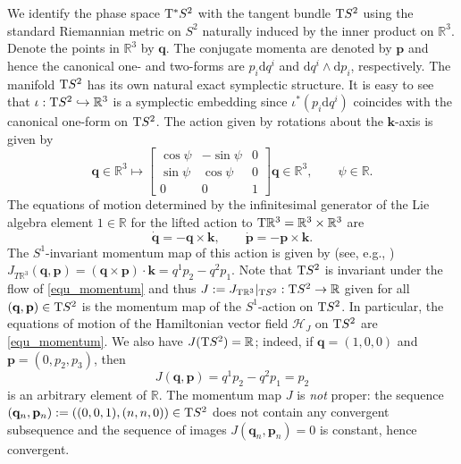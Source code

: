 \documentclass[11pt]{article}
\newcommand{\DD}{\mathrm{d}}
\begin{document}
We identify the phase space ${\rm T}^\ast S^2$ with the tangent bundle
${\rm T}S^2$ using the standard Riemannian metric on $S^2$ naturally
induced by the inner product on $\mathbb{R}^3$. Denote the points in
$\mathbb{R}^3$ by $\mathbf{q}$. The conjugate momenta are denoted by
$\mathbf{p}$ and hence the canonical one- and two-forms are $p_i\DD
q^i$ and $\DD q^i\wedge \DD p _i$, respectively.  The manifold ${\rm
  T}S ^2$ has its own natural exact symplectic structure.  It is easy
to see that $\iota:{\rm T} S ^2 \hookrightarrow \mathbb{R}^3$ is a
symplectic embedding since $\iota^\ast\left(p_i\DD q^i\right)$
coincides with the canonical one-form on ${\rm T}S^2$. The action
given by rotations about the $\mathbf{k}$-axis is given by
\begin{equation}
  \label{action_formula}
  \mathbf{q}\in \mathbb{R}^3 \mapsto
  \begin{bmatrix}
    \cos \psi &-\sin \psi&0\\
    \sin \psi & \cos \psi& 0\\
    0&0& 1
  \end{bmatrix} \mathbf{q} \in \mathbb{R}^3, \qquad \psi \in
  \mathbb{R}. \nonumber
\end{equation}
The equations of motion determined by the infinitesimal generator of
the Lie algebra element $1 \in \mathbb{R}$ for the lifted action to
${\rm T} \mathbb{R}^3 = \mathbb{R}^3\times \mathbb{R}^3$ are
\begin{equation}
  \label{equ_momentum}
  \dot{\mathbf{q}} = - \mathbf{q} \times \mathbf{k}, \qquad 
  \dot{\mathbf{p}} = - \mathbf{p}\times \mathbf{k}.
\end{equation}
The $S^1$-invariant momentum map of this action is given by (see,
e.g., \cite[Theorem 12.1.4]{MaRa2003}) $J_{T \mathbb{R}^3}(\mathbf{q},
\mathbf{p}) = (\mathbf{q}\times \mathbf{p}) \cdot \mathbf{k} = q^1p_2
- q^2p_1$. Note that ${\rm T}S^2$ is invariant under the flow of
\eqref{equ_momentum} and thus $J:=J_{{\rm T} \mathbb{R}^3}|_{{\rm
    T}S^2}:{\rm T}S^2 \rightarrow \mathbb{R}$ given for all
$(\mathbf{q}, \mathbf{p}) \in {\rm T}S^2$ is the momentum map of the
$S^1$-action on ${\rm T}S^2$. In particular, the equations of motion
of the Hamiltonian vector field $\mathcal{H}_J $ on ${\rm T}S^2$ are
\eqref{equ_momentum}.  We also have $J({\rm T}S^2) = \mathbb{R}$;
indeed, if $\mathbf{q}=(1,0,0)$ and $\mathbf{p}=(0,p_2, p_3)$, then
$$
J(\mathbf{q}, \mathbf{p}) = q^1p_2 - q^2p_1 = p_2
$$ 
is an arbitrary element of $\mathbb{R}$. The momentum map $J$ is
\textit{not} proper: the sequence $(\mathbf{q}_n, \mathbf{p}_n):=
((0,0,1), (n,n,0))\in {\rm T} S^2$ does not contain any convergent
subsequence and the sequence of images $J(\mathbf{q}_n, \mathbf{p}_n)
=0$ is constant, hence convergent.
\end{document}
